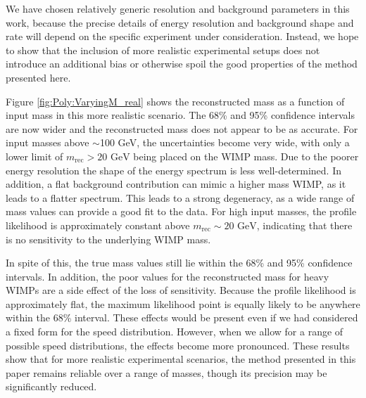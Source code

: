 We have chosen relatively generic resolution and background parameters in this work, because the precise details of energy resolution and background shape and rate will depend on the specific experiment under consideration. Instead, we hope to show that the inclusion of more realistic experimental setups does not introduce an additional bias or otherwise spoil the good properties of the method presented here.

Figure \ref{fig:Poly:VaryingM_real} shows the reconstructed mass as a function of input mass in this more realistic scenario. The 68\% and 95\% confidence intervals are now wider and the reconstructed mass does not appear to be as accurate. For input masses above $\sim$100 GeV, the uncertainties become very wide, with only a lower limit of $m_\textrm{rec} > 20 \textrm{ GeV}$ being placed on the WIMP mass.  Due to the poorer energy resolution the shape of the energy spectrum is less well-determined. In addition, a flat background contribution can mimic a higher mass WIMP, as it leads to a flatter spectrum. This leads to a strong degeneracy, as a wide range of mass values can provide a good fit to the data. For high input masses, the profile likelihood is approximately constant above $m_\textrm{rec} \sim 20 \textrm{ GeV}$, indicating that there is no sensitivity to the underlying WIMP mass.

In spite of this, the true mass values still lie within the 68\% and 95\% confidence intervals. In addition, the poor values for the reconstructed mass for heavy WIMPs are a side effect of the loss of sensitivity. Because the profile likelihood is approximately flat, the maximum likelihood point is equally likely to be anywhere within the 68\% interval. These effects would be present even if we had considered a fixed form for the speed distribution. However, when we allow for a range of possible speed distributions, the effects become more pronounced. These results show that for more realistic experimental scenarios, the method presented in this paper remains reliable over a range of masses, though its precision may be significantly reduced.

